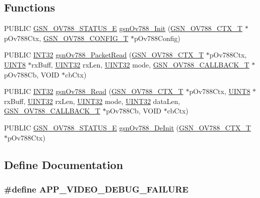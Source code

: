 \subsection*{Functions}
\begin{DoxyCompactItemize}
\item 
PUBLIC \hyperlink{a00537_ad1eec137ad450b79f2207a5a6e87d9ac}{GSN\_\-OV788\_\-STATUS\_\-E} \hyperlink{a00537_aca76f19f3c9e424e01912ed3a3718cdd}{gsnOv788\_\-Init} (\hyperlink{a00179}{GSN\_\-OV788\_\-CTX\_\-T} $\ast$pOv788Ctx, \hyperlink{a00178}{GSN\_\-OV788\_\-CONFIG\_\-T} $\ast$pOv788Config)
\item 
PUBLIC \hyperlink{a00660_ga63021d67d54286c2163bcdb43a6f2569}{INT32} \hyperlink{a00537_a04ccba3f0e08718595c61cef1bcf517c}{gsnOv788\_\-PacketRead} (\hyperlink{a00179}{GSN\_\-OV788\_\-CTX\_\-T} $\ast$pOv788Ctx, \hyperlink{a00660_gab27e9918b538ce9d8ca692479b375b6a}{UINT8} $\ast$rxBuff, \hyperlink{a00660_gae1e6edbbc26d6fbc71a90190d0266018}{UINT32} rxLen, \hyperlink{a00660_gae1e6edbbc26d6fbc71a90190d0266018}{UINT32} mode, \hyperlink{a00537_aaca340fbce9b168b056214ae64de57df}{GSN\_\-OV788\_\-CALLBACK\_\-T} $\ast$pOv788Cb, VOID $\ast$cbCtx)
\item 
PUBLIC \hyperlink{a00660_ga63021d67d54286c2163bcdb43a6f2569}{INT32} \hyperlink{a00537_a9eb6198e01f301a5fd7259a122a9b09d}{gsnOv788\_\-Read} (\hyperlink{a00179}{GSN\_\-OV788\_\-CTX\_\-T} $\ast$pOv788Ctx, \hyperlink{a00660_gab27e9918b538ce9d8ca692479b375b6a}{UINT8} $\ast$rxBuff, \hyperlink{a00660_gae1e6edbbc26d6fbc71a90190d0266018}{UINT32} rxLen, \hyperlink{a00660_gae1e6edbbc26d6fbc71a90190d0266018}{UINT32} mode, \hyperlink{a00660_gae1e6edbbc26d6fbc71a90190d0266018}{UINT32} dataLen, \hyperlink{a00537_aaca340fbce9b168b056214ae64de57df}{GSN\_\-OV788\_\-CALLBACK\_\-T} $\ast$pOv788Cb, VOID $\ast$cbCtx)
\item 
PUBLIC \hyperlink{a00537_ad1eec137ad450b79f2207a5a6e87d9ac}{GSN\_\-OV788\_\-STATUS\_\-E} \hyperlink{a00537_a8ab692cbf99fbee26df8efd13c65f1fe}{gsnOv788\_\-DeInit} (\hyperlink{a00179}{GSN\_\-OV788\_\-CTX\_\-T} $\ast$pOv788Ctx)
\end{DoxyCompactItemize}


\subsection{Define Documentation}
\hypertarget{a00537_a12d82eaeafad6bf9d726f8ada951c26a}{
\subsubsection[{APP\_\-VIDEO\_\-DEBUG\_\-FAILURE}]{\setlength{\rightskip}{0pt plus 5cm}\#define APP\_\-VIDEO\_\-DEBUG\_\-FAILURE}}
\label{a00537_a12d82eaeafad6bf9d726f8ada951c26a}


